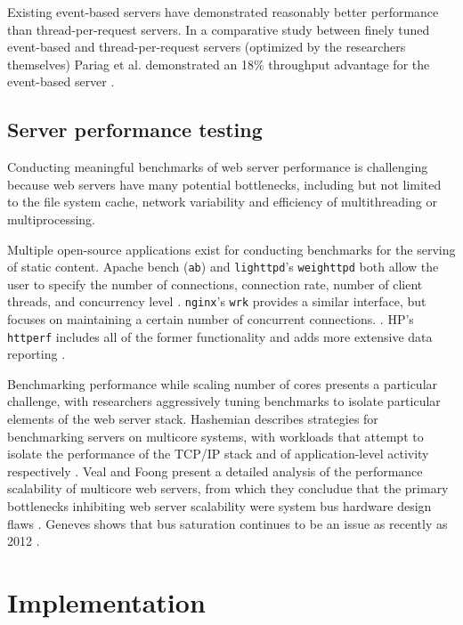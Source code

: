 \documentclass[twoside,10pt]{article}
\begin{document}
\begin{multicols}{2}
Existing event-based servers have demonstrated reasonably better
performance than thread-per-request servers. In a comparative study
between finely tuned event-based and thread-per-request servers
(optimized by the researchers themselves) Pariag et al. demonstrated
an 18\% throughput advantage for the event-based server
\cite{pariag2007comparing}.

\subsection{Server performance testing}

Conducting meaningful benchmarks of web server performance is
challenging because web servers have many potential bottlenecks,
including but not limited to the file system cache, network
variability and efficiency of multithreading or multiprocessing.

Multiple open-source applications exist for conducting benchmarks for
the serving of static content. Apache bench (\verb+ab+) and
\verb+lighttpd+'s \verb+weighttpd+ both allow the user to specify the
number of connections, connection rate, number of client threads, and
concurrency level
\cite{fielding1997apache,kneschke2003lighttpd}. \verb+nginx+'s
\verb+wrk+ provides a similar interface, but focuses on maintaining a
certain number of concurrent connections. \cite{syosevnginx}. HP's
\verb+httperf+ includes all of the former functionality and adds more
extensive data reporting \cite{mosberger1998httperf}.

Benchmarking performance while scaling number of cores presents a
particular challenge, with researchers aggressively tuning benchmarks
to isolate particular elements of the web server stack. Hashemian
describes strategies for benchmarking servers on multicore systems,
with workloads that attempt to isolate the performance of the TCP/IP
stack and of application-level activity respectively
\cite{hashemian2013improving}. Veal and Foong present a detailed
analysis of the performance scalability of multicore web servers, from
which they concludue that the primary bottlenecks inhibiting web
server scalability were system bus hardware design flaws
\cite{veal2007performance}. Geneves shows that bus saturation
continues to be an issue as recently as 2012
\cite{geneves2012analysis}.

\section{Implementation}


\end{multicols}
\end{document}
